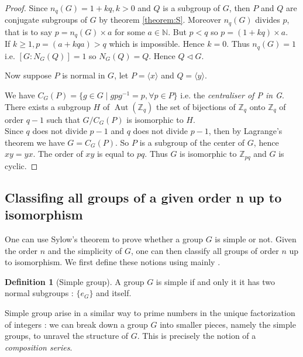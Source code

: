 \documentclass{article}
\theoremstyle{definition}
\theoremstyle{plain}
\theoremstyle{plain}
\theoremstyle{plain}
\theoremstyle{plain}
\theoremstyle{definition}
\newtheorem{defeng}[subsubsection]{Definition}
\theoremstyle{plain}
\theoremstyle{plain}
\DeclareMathOperator{\Aut}{Aut} %
\begin{document}
\begin{proof}
	Since \( n_q(G) = 1 + kq, k > 0 \) and \( Q \) is a subgroup of \( G \), then \( P \) and \( Q \) are conjugate subgroups of \( G \) by theorem \ref{theorem:S}. Moreover \( n_q(G) \) divides \( p \), that is to say \( p = n_q(G) \times a \) for some \( a \in \mathbb{N} \).
	But \( p < q \) so \( p = (1 + kq)\times a \). \\
	If \( k \geq 1, p = (a + kqa) > q \) which is impossible. Hence \( k = 0 \).
	Thus \( n_q(G) = 1 \) i.e. \( [G : N_G(Q)] = 1 \) so \( N_G(Q) = Q \).
	Hence \( Q \triangleleft G \). 

	Now suppose \( P \) is normal in \( G \), let \( P = \langle x \rangle \) and \( Q = \langle y \rangle \).

	We have \( C_G(P) = \{ g \in G \mid gpg^{-1} = p, \forall p \in P\} \) i.e. the \textit{centraliser of P in G}.
	There exists a subgroup \( H \) of \( \Aut({\mathbb{Z}_{q}}) \) the set of bijections of \( \mathbb{Z}_{q} \) onto \( \mathbb{Z}_{q} \) of order \( q-1 \) such that \( G/C_G(P) \) is isomorphic to \( H \). \\
	Since \( q \) does not divide \( p-1 \) and \( q \) does not divide \( p-1 \), then by Lagrange's theorem we have \( G = C_G(P) \). 
	So \( P \) is a subgroup of the center of \( G \), hence \( xy = yx \). The order of
	\( xy \) is equal to \( pq \).
	Thus \( G \) is isomorphic to \( \mathbb{Z}_{pq} \) and \( G \) is cyclic.
\end{proof}

\subsection{Classifing all groups of a given order n up to isomorphism}

\par One can use Sylow's theorem to prove whether a group \( G \) is simple or not. Given the order \( n \) and the simplicity of \( G \), one can then classify all groups of order \( n \) up to isomorphism. We first define these notions using mainly \cite[p.~103]{dummit2003abstract}.


\begin{defeng}[Simple group]
	A group \( G \) is simple if and only it it has two normal subgroups : 
	\( \{e_G\} \) and itself.
\end{defeng}

\par Simple group arise in a similar way to prime numbers in the unique factorization of integers : we can break down a group \( G \) into smaller pieces, namely the simple groups, to unravel the structure of \( G \).
This is precisely the notion of a \textit{composition series}.
\end{document}
